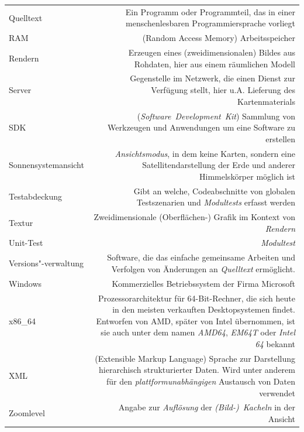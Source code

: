 \documentclass[10pt]{scrreprt}
\newcommand{\textref}[1]{\mbox{\raisebox{0.1ex}{\small$\rightarrow$ }\textit{#1}}}
\begin{document}
\begin{longtabu}{L{0.35} R{1.65}}
Quelltext & Ein Programm oder Programmteil, das in einer menschenlesbaren Programmiersprache vorliegt\\
RAM & (Random Access Memory) Arbeitsspeicher\\
Rendern & Erzeugen eines (zweidimensionalen) Bildes aus Rohdaten, hier aus einem räumlichen Modell\\
Server & Gegenstelle im Netzwerk, die einen Dienst zur Verfügung stellt, hier u.A. Lieferung des Kartenmaterials\\
SDK & (\textref{Software Development Kit}) Sammlung von Werkzeugen und Anwendungen um eine Software zu erstellen\\
Sonnensystemansicht & \textref{Ansichtsmodus}, in dem keine Karten, sondern eine Satellitendarstellung der Erde und anderer Himmelskörper möglich ist\\
Testabdeckung & Gibt an welche, Codeabschnitte von globalen Testszenarien und \textref{Modultests} erfasst werden \\
Textur & Zweidimensionale (Oberflächen-) Grafik im Kontext von \textref{Rendern}\\
Unit-Test & \textref{Modultest}\\
Versions"-verwaltung & Software, die das einfache gemeinsame Arbeiten und Verfolgen von Änderungen an \textref{Quelltext} ermöglicht.\\
Windows & Kommerzielles Betriebssystem der Firma Microsoft\\
x86\_64 & Prozessorarchitektur für 64-Bit-Rechner, die sich heute in den meisten verkauften Desktopsystemen findet. Entworfen von AMD, später von Intel übernommen, ist sie auch unter dem namen \textit{AMD64}, \textit{EM64T} oder \textit{Intel 64} bekannt\\
XML & (Extensible Markup Language) Sprache zur Darstellung hierarchisch strukturierter Daten. Wird unter anderem für den \textref{plattformunabhängigen} Austausch von Daten verwendet\\
Zoomlevel & Angabe zur \textref{Auflösung} der \textref{(Bild-) Kacheln} in der Ansicht\\
\end{longtabu}
\end{document}

